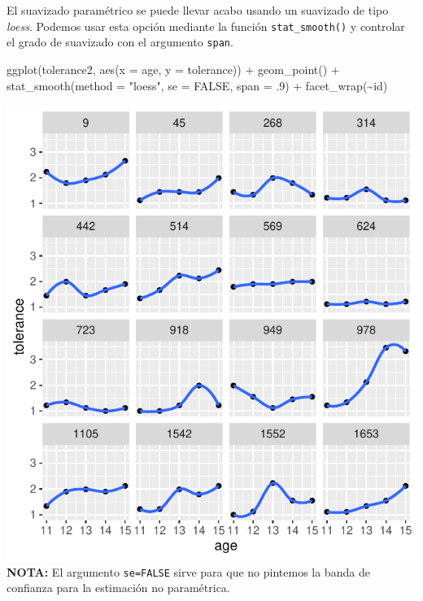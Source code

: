 \documentclass[
]{book}
\newenvironment{Shaded}{\begin{snugshade}}{\end{snugshade}}
\newcommand{\AttributeTok}[1]{\textcolor[rgb]{0.77,0.63,0.00}{#1}}
\newcommand{\ConstantTok}[1]{\textcolor[rgb]{0.00,0.00,0.00}{#1}}
\newcommand{\DecValTok}[1]{\textcolor[rgb]{0.00,0.00,0.81}{#1}}
\newcommand{\FunctionTok}[1]{\textcolor[rgb]{0.00,0.00,0.00}{#1}}
\newcommand{\NormalTok}[1]{#1}
\newcommand{\SpecialCharTok}[1]{\textcolor[rgb]{0.00,0.00,0.00}{#1}}
\newcommand{\StringTok}[1]{\textcolor[rgb]{0.31,0.60,0.02}{#1}}
\begin{document}
El suavizado paramétrico se puede llevar acabo usando un suavizado de tipo \emph{loess}. Podemos usar esta opción mediante la función \texttt{stat\_smooth()} y controlar el grado de suavizado con el argumento \texttt{span}.

\begin{Shaded}
\begin{Highlighting}[]
\FunctionTok{ggplot}\NormalTok{(tolerance2, }\FunctionTok{aes}\NormalTok{(}\AttributeTok{x =}\NormalTok{ age, }\AttributeTok{y =}\NormalTok{ tolerance)) }\SpecialCharTok{+}
  \FunctionTok{geom\_point}\NormalTok{() }\SpecialCharTok{+}
  \FunctionTok{stat\_smooth}\NormalTok{(}\AttributeTok{method =} \StringTok{"loess"}\NormalTok{, }\AttributeTok{se =} \ConstantTok{FALSE}\NormalTok{, }\AttributeTok{span =}\NormalTok{ .}\DecValTok{9}\NormalTok{) }\SpecialCharTok{+}
  \FunctionTok{facet\_wrap}\NormalTok{(}\SpecialCharTok{\textasciitilde{}}\NormalTok{id)}
\end{Highlighting}
\end{Shaded}

\includegraphics{fig_out/unnamed-chunk-37-1.pdf}
\textbf{NOTA:} El argumento \texttt{se=FALSE} sirve para que no pintemos la banda de confianza para la estimación no paramétrica.
\end{document}

